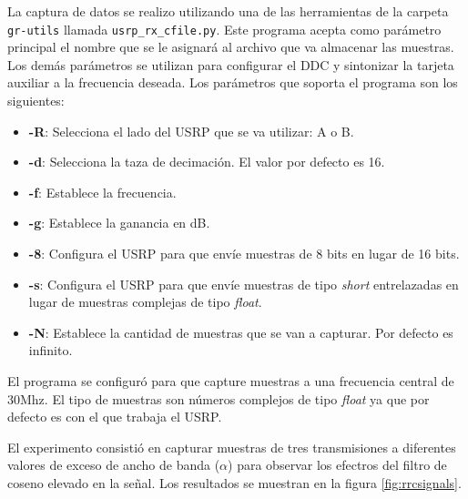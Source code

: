 La captura de datos se realizo utilizando una de las herramientas de la carpeta \verb|gr-utils|
llamada \verb|usrp_rx_cfile.py|. Este programa acepta como par\'ametro principal el nombre que se le
asignar\'a al archivo que va almacenar las muestras. Los dem\'as par\'ametros se utilizan para
configurar el DDC y sintonizar la tarjeta auxiliar a la frecuencia deseada. Los par\'ametros que
soporta el programa son los siguientes:

\begin{itemize}
  \item \textbf{-R}: Selecciona el lado del USRP que se va utilizar: A o B.
  \item \textbf{-d}: Selecciona la taza de decimaci\'on. El valor por defecto es 16.
  \item \textbf{-f}: Establece la frecuencia.
  \item \textbf{-g}: Establece la ganancia en dB.
  \item \textbf{-8}: Configura el USRP para que env\'ie muestras de 8 bits en lugar de 16 bits.
  \item \textbf{-s}: Configura el USRP para que env\'ie muestras de tipo \emph{short} entrelazadas
  en lugar de muestras complejas de tipo \emph{float}.
  \item \textbf{-N}: Establece la cantidad de muestras que se van a capturar. Por defecto es
  infinito.
\end{itemize}

El programa se configur\'o para que capture muestras a una frecuencia central de 30Mhz. El tipo de
muestras son n\'umeros complejos de tipo \emph{float} ya que por defecto es con el que trabaja el USRP.

El experimento consisti\'o en capturar muestras de tres transmisiones a diferentes valores de exceso
de ancho de banda ($\alpha$) para observar los efectros del filtro de coseno elevado en la se\~nal.
Los resultados se muestran en la figura \ref{fig:rrcsignals}.


